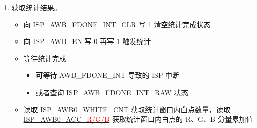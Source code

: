 \documentclass[main\_\_CN.tex]{subfiles}
\begin{document}
\begin{enumerate}
    \item 获取统计结果。
    \begin{itemize}
        \item 向 \hyperref[fielddesc:ISPAWBFDONEINTCLR]{ISP\_AWB\_FDONE\_INT\_CLR} 写 1 清空统计完成状态
        \item 向 \hyperref[fielddesc:ISPAWBEN]{ISP\_AWB\_EN} 写 0 再写 1 触发统计
        \item 等待统计完成
        \begin{itemize}
            \item 可等待 AWB\_FDONE\_INT 导致的 ISP 中断
            \item 或者查询 \hyperref[fielddesc:ISPAWBFDONEINTRAW]{ISP\_AWB\_FDONE\_INT\_RAW} 状态
        \end{itemize}
        \item 读取 \hyperref[fielddesc:ISPAWB0WHITECNT]{ISP\_AWB0\_WHITE\_CNT} 获取统计窗口内白点数量，读取 \hyperref[fielddesc:ISPAWB0ACCR]{ISP\_AWB0\_ACC\_\textcolor{red}{R/G/B}} 获取统计窗口内白点的 R、G、B 分量累加值
    \end{itemize}
\end{enumerate}
\end{document}
